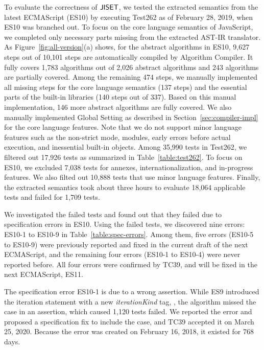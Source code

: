 To evaluate the correctness of \( \text{\sf JISET} \), we tested the extracted semantics
from the latest ECMAScript (ES10) by executing Test262 as of February 28, 2019,
when ES10 was branched out.
To focus on the core language semantics of JavaScript, we completed
only necessary parts missing from the extracted AST-IR translator.
As Figure~\ref{fig:all-version}(a) shows, for the abstract algorithms
in ES10, 9,627 steps out of 10,101 steps are
automatically compiled by \textsf{Algorithm Compiler}.
It fully covers 1,783 algorithms out of 2,026 abstract algorithms
and 243 algorithms are partially covered.
Among the remaining 474 steps, we manually implemented all
missing steps for the core language semantics (137 steps) and
the essential parts of the built-in libraries (140 steps out of 337).
Based on this manual implementation, 146 more abstract algorithms are fully covered.
We also manually implemented \textsf{Global Setting}
as described in Section~\ref{sec:compiler-impl} for the core language features.
Note that we do not support minor language features such as the
non-strict mode, modules, early errors before actual execution, and
inessential built-in objects.
Among 35,990 tests in Test262, we filtered out 17,926
tests as summarized in Table~\ref{table:test262}.  To focus on ES10,
we excluded 7,038 tests for annexes, internationalization, and
in-progress features.  We also filted out 10,888 tests that use
minor language features.
Finally, the extracted semantics took about three hours to evaluate 18,064
applicable tests and failed for 1,709 tests.

We investigated the failed tests and found out that they failed due to
specification errors in ES10.  Using the failed tests, we
discovered nine errors: ES10-1 to ES10-9 in
Table~\ref{table:spec-errors}.  Among them, five errors (ES10-5 to
ES10-9) were previously reported and fixed in the current draft of the
next ECMAScript, and the remaining four errors (ES10-1 to ES10-4) were
never reported before.  All four errors were confirmed by TC39, and
will be fixed in the next ECMAScript, ES11.

The specification error ES10-1 is due to a wrong assertion.
While ES9 introduced the  iteration statement with a
new {\it iterationKind} tag, , the
 algorithm missed the
 case in an assertion, which caused 1,120
tests failed.  We reported the error and proposed a specification fix
to include  the  case, and TC39 accepted it on
March 25, 2020.  Because the error was created on February 16, 2018,
it existed for 768 days.

